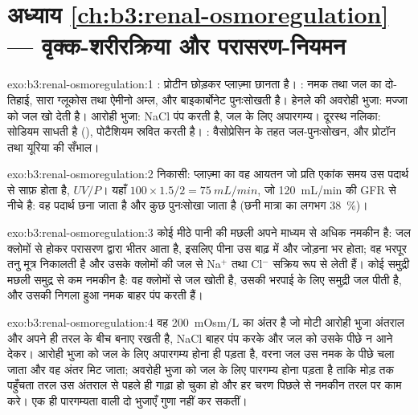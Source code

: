 \section*{अध्याय \ref{ch:b3:renal-osmoregulation} --- वृक्क-शरीरक्रिया और परासरण-नियमन}

\begin{solution}{exo:b3:renal-osmoregulation:1}
: प्रोटीन छोड़कर प्लाज़्मा छानता है। : नमक तथा
जल का दो-तिहाई, सारा ग्लूकोस तथा ऐमीनो अम्ल, और बाइकार्बोनेट पुनःसोखती
है। हेनले की अवरोही भुजा: मज्जा को जल खो देती है। आरोही भुजा: NaCl
पंप करती है, जल के लिए अपारगम्य। दूरस्थ नलिका: सोडियम साधती है
(), पोटैशियम स्रवित करती है। : वैसोप्रेसिन के
तहत जल-पुनःसोखन, और प्रोटॉन तथा यूरिया की सँभाल।
\end{solution}

\begin{solution}{exo:b3:renal-osmoregulation:2}
निकासी: प्लाज़्मा का वह आयतन जो प्रति एकांक समय उस पदार्थ से साफ़ होता
है, $UV/P$। यहाँ $100\times 1.5/2 = \qty{75}{mL/min}$, जो
\qty{120}{mL/min} की GFR से नीचे है: वह पदार्थ छना जाता है और कुछ
पुनःसोखा जाता है (छनी मात्रा का लगभग \qty{38}{\%})।
\end{solution}

\begin{solution}{exo:b3:renal-osmoregulation:3}
कोई मीठे पानी की मछली अपने माध्यम से अधिक नमकीन है: जल क्लोमों से होकर
परासरण द्वारा भीतर आता है, इसलिए पीना उस बाढ़ में और जोड़ना भर होता; वह
भरपूर तनु मूत्र निकालती है और उसके क्लोमों की  जल से
Na$^{+}$ तथा Cl$^{-}$ सक्रिय रूप से लेती हैं। कोई समुद्री मछली समुद्र
से कम नमकीन है: वह क्लोमों से जल खोती है, उसकी भरपाई के लिए समुद्री जल
पीती है, और उसकी  निगला हुआ नमक बाहर पंप करती हैं।
\end{solution}

\begin{solution}{exo:b3:renal-osmoregulation:4}
 वह \qty{200}{mOsm/L} का अंतर है जो मोटी आरोही भुजा अंतराल
और अपने ही तरल के बीच बनाए रखती है, NaCl बाहर पंप करके और जल को उसके
पीछे न आने देकर। आरोही भुजा को जल के लिए अपारगम्य होना ही पड़ता है,
वरना जल उस नमक के पीछे चला जाता और वह अंतर मिट जाता; अवरोही भुजा को जल
के लिए पारगम्य होना पड़ता है ताकि मोड़ तक पहुँचता तरल उस अंतराल से पहले
ही गाढ़ा हो चुका हो और हर चरण पिछले से नमकीन तरल पर काम करे। एक ही
पारगम्यता वाली दो भुजाएँ गुणा नहीं कर सकतीं।
\end{solution}

